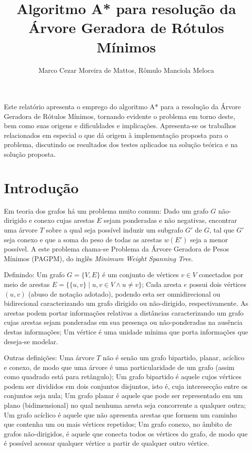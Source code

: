 \documentclass[12pt]{article}
\title{Algoritmo A* para resolução da Árvore Geradora de Rótulos Mínimos}
\author{Marco Cezar Moreira de Mattos\inst{1}, Rômulo Manciola Meloca\inst{1}}
\begin{document}
\maketitle

\begin{resumo}
	Este relatório apresenta o emprego do algoritmo A* para a resolução da Árvore Geradora de Rótulos Mínimos, tornando evidente o problema em torno deste, bem como suas origens e dificuldades e implicações. Apresenta-se os trabalhos relacionados em especial o que dá origem à implementação proposta para o problema, discutindo os resultados dos testes aplicados na solução teórica e na solução proposta.
\end{resumo}

\section{Introdução}\label{sec:introducao}

	Em teoria dos grafos há um problema muito comum: Dado um grafo $G$ não-dirigido e conexo cujas arestas $E$ sejam ponderadas e não negativas, encontrar uma árvore $T$ sobre a qual seja possível induzir um subgrafo $G'$ de $G$, tal que $G'$ seja conexo e que a soma do peso de todas as arestas $w(E')$ seja a menor possível. A este problema chama-se Problema da Árvore Geradora de Pesos Mínimos (PAGPM), do inglês \textit{Minimum Weight Spanning Tree}.

	Definindo: Um grafo $G = \{V, E\}$ é um conjunto de vértices $v \in V$ conectados por meio de arestas $E = \{\{u, v\} \mid u, v \in V \wedge u \neq v\}$; Cada aresta $e$ possui dois vértices $(u, v)$ (abuso de notação adotado), podendo esta ser omnidirecional ou bidirecional caracterizando um grafo dirigido ou não-dirigido, respectivamente. As arestas podem portar informações relativas a distâncias caracterizando um grafo cujas arestas sejam ponderadas em sua presença ou não-ponderadas na ausência destas informações; Um vértice é uma unidade mínima que porta informações que deseja-se modelar.

	Outras definições: Uma árvore $T$ não é senão um grafo bipartido, planar, acíclico e conexo, de modo que uma árvore é uma particularidade de um grafo (assim como quadrado está para retângulo); Um grafo bipartido é aquele cujos vértices podem ser divididos em dois conjuntos disjuntos, isto é, cuja interesecção entre os conjuntos seja nula; Um grafo planar é aquele que pode ser representado em um plano (bidimensional) no qual nenhuma aresta seja concorrente a qualquer outra; Um grafo acíclico é aquele que não apresenta arestas que formem um caminho que contenha um ou mais vértices repetidos; Um grafo conexo, no âmbito de grafos não-dirigidos, é aquele que conecta todos os vértices do grafo, de modo que é possível acessar qualquer vértice a partir de qualquer outro vértice.
\end{document}

